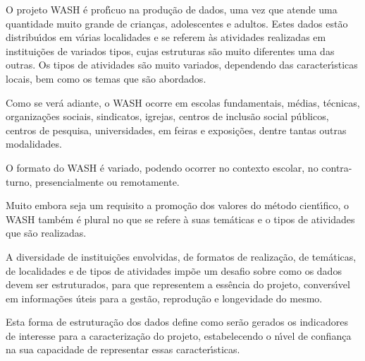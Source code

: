 \documentclass[
12pt,		%
openright,	%
twoside,  %
a4paper,			%
chapter=TITLE,		%
english,			%
french,				%
spanish,			%
brazil				%
]{USPSC-classe/USPSC}
\begin{document}
O projeto WASH \'e prof\'{\i}cuo na produ\c{c}\~ao de dados, uma vez que atende uma quantidade muito grande de crian\c{c}as, adolescentes e adultos. Estes dados est\~ao distribu\'{\i}dos em v\'arias localidades e se referem \`as atividades realizadas em institui\c{c}\~oes de variados tipos, cujas estruturas s\~ao muito diferentes uma das outras. Os tipos de atividades s\~ao muito variados, dependendo das caracter\'{\i}sticas locais, bem como os temas que s\~ao abordados.










Como se ver\'a adiante, o WASH ocorre  em escolas fundamentais, m\'edias, t\'ecnicas, organiza\c{c}\~oes sociais, sindicatos, igrejas, centros de inclus\~ao social p\'ublicos, centros de pesquisa, universidades, em feiras e exposi\c{c}\~oes, dentre tantas outras modalidades.










O formato do WASH \'e variado, podendo ocorrer no contexto escolar, no contra-turno, presencialmente ou remotamente.










Muito embora seja um requisito a promo\c{c}\~ao dos valores do m\'etodo cient\'{\i}fico, o WASH tamb\'em \'e plural no que se refere \`a suas tem\'aticas e o tipos de atividades que s\~ao realizadas.










A diversidade de institui\c{c}\~oes envolvidas, de formatos de realiza\c{c}\~ao, de tem\'aticas, de localidades e de tipos de atividades imp\~oe um desafio sobre como os dados devem ser estruturados, para que representem a ess\^encia do projeto, convers\'{\i}vel em informa\c{c}\~oes \'uteis para a gest\~ao, reprodu\c{c}\~ao e longevidade do mesmo.










Esta forma de estrutura\c{c}\~ao dos dados define como ser\~ao gerados os indicadores de interesse para a caracteriza\c{c}\~ao do projeto, estabelecendo o n\'{\i}vel de confian\c{c}a na sua capacidade de representar essas caracter\'{\i}sticas.
\end{document}
